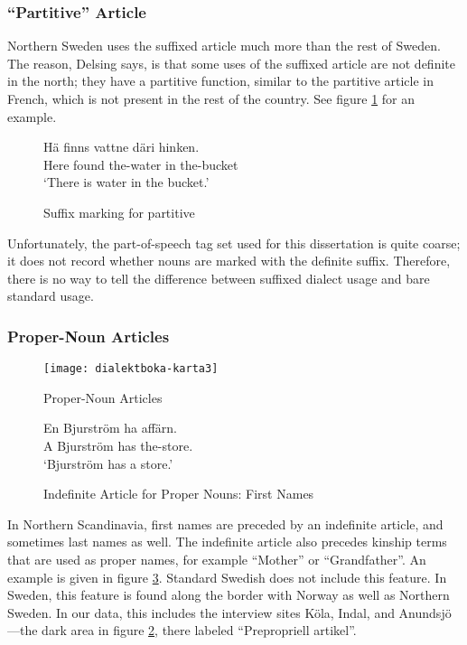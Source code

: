 \subsubsection{``Partitive'' Article}

Northern Sweden uses the suffixed article much more than the rest of
Sweden. The reason, Delsing says, is that some uses of the suffixed
article are not definite in the north; they have a partitive function,
similar to the partitive article in French, which is not present in
the rest of the country. See figure \ref{partitive-article} for an
example.

\begin{figure}
  \gll H\"a finns vattne d\"ari hinken. \\
  Here found the-water in the-bucket \\
  \trans `There is water in the bucket.'
  \caption{Suffix marking for partitive}
  \label{partitive-article}
\end{figure}

Unfortunately, the part-of-speech tag set used for this dissertation
is quite coarse; it does not record whether nouns are marked with the
definite suffix. Therefore, there is no way to tell the difference
between suffixed dialect usage and bare standard usage.

\subsubsection{Proper-Noun Articles}

\begin{figure}
  \texttt{[image: dialektboka-karta3]}
  \caption{Proper-Noun Articles}
  \label{indefinite-article-proper-noun-map}
\end{figure}

\begin{figure}
 \gll En Bjurstr\"om ha aff\"arn. \\
  A Bjurstr\"om has the-store. \\
  \trans `Bjurstr\"om has a store.'
  \caption{Indefinite Article for Proper Nouns: First Names}
  \label{indefinite-article-proper-noun}
\end{figure}

In Northern Scandinavia, first names are preceded by an indefinite
article, and sometimes last names as well. The indefinite article also
precedes kinship terms that are used as proper names, for example
``Mother'' or ``Grandfather''. An example is given in figure
\ref{indefinite-article-proper-noun}. Standard Swedish does not
include this feature. In Sweden, this feature is found along the
border with Norway as well as Northern Sweden. In our data, this
includes the interview sites K\"ola, Indal, and Anundsj\"o---the dark
area in figure \ref{indefinite-article-proper-noun-map}, there labeled
``Prepropriell artikel''.

